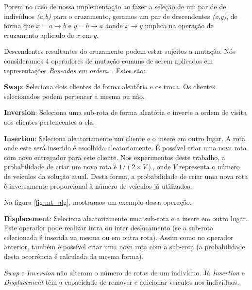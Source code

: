 Porem no caso de nossa implementação ao fazer a seleção de um par de de indivíduos \textit{(a,b)} para o cruzamento, geramos um par de descendentes \textit{({x,y})}, de forma que \(x = a \rightarrow b\) e \(y = b \rightarrow a\) aonde $x \rightarrow y$ implica na operação de cruzamento aplicado de $x$ em $y$.


Descendentes resultantes do cruzamento podem estar sujeitos a mutação. Nós consideramos 4 operadores de mutação comuns de serem aplicados em representações \textit{Baseadas em ordem}. \cite{Rocha}. Estes são:

\textbf{Swap}: Seleciona dois clientes de forma aleatória e os troca. Os clientes selecionados podem pertencer a mesma ou não.

\textbf{Inversion}: Seleciona uma sub-rota de forma aleatória e inverte a ordem de visita aos clientes pertencentes a ela.

\textbf{Insertion}: Seleciona aleatoriamente um cliente e o insere em outro lugar. A rota onde este será inserido é escolhida aleatoriamente. É possível criar uma nova rota com novo entregador para este cliente. Nos experimentos deste trabalho, a probabilidade de criar um novo rota é $1 / (2 \times V)$, onde $V$ representa o número de veículos da solução atual. Desta forma, a probabilidade de criar uma nova rota é inversamente proporcional à número de veículos já utilizados. 

Na figura \ref{fig:mt_alg}, mostramos um exemplo dessa operação.

\textbf{Displacement}: Seleciona aleatoriamente uma sub-rota e a insere em outro lugar. Este operador pode realizar intra ou inter deslocamento (se a sub-rota selecionada é inserida na
mesma ou em outra rota). Assim como no operador anterior, também é possível criar uma nova rota com a sub-rota (a probabilidade desta ocorrência é calculada da mesma forma).

\begin{center}
	\label{fig:mt_alg}
\end{center}


\textit{Swap} e \textit{Inversion} não alteram o número de rotas de um indivíduo. Já \textit{Insertion} e \textit{Displacement} têm a capacidade de remover e adicionar veículos nos indivíduos.

